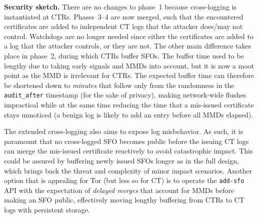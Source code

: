 \textbf{Security sketch.} 
There are no changes to phase~1 because cross-logging is instantiated at CTRs.
Phases~3--4 are now merged, such that the encountered certificates are added to
independent CT logs that the attacker does/may not control.  Watchdogs are no
longer needed since either the certificates are added to a log that the attacker
controls, or they are not.  The other main difference takes place in phase~2,
during which CTRs buffer SFOs.  The buffer time used to be lengthy due to taking
early signals and MMDs into account, but it is now a moot point as the MMD is
irrelevant for CTRs.  The expected buffer time can therefore be shortened down
to \emph{minutes} that follow only from the randomness in the
\texttt{audit\_after} timestamp (for the sake of privacy), making network-wide
flushes impractical while at the same time reducing the time that a mis-issued
certificate stays unnoticed (a benign log is likely to add an entry before all
MMDs elapsed).

The extended cross-logging also aims to expose log misbehavior.  As such, it is
paramount that no cross-logged SFO becomes public before the issuing CT logs can
merge the mis-issued certificate reactively to avoid catastrophic impact. This
could be assured by buffering newly issued SFOs longer as in the full design,
which brings back the threat and complexity of minor impact scenarios. Another
option that is appealing for Tor (but less so for CT) is to operate the
\texttt{add-sfo} API with the expectation of \emph{delayed merges} that account
for MMDs before making an SFO public, effectively moving lengthy buffering from
CTRs to CT logs with persistent storage.
